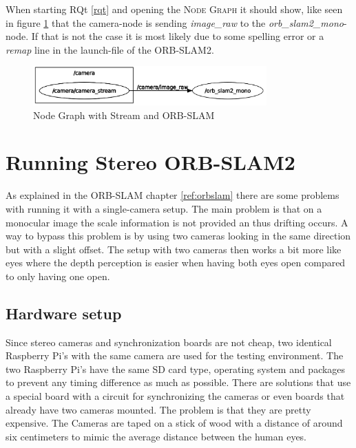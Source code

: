 When starting RQt \ref{rqt} and opening the \textsc{Node Graph} it should show, like seen in figure \ref{img:nodegraphstreamorbslam} that the camera-node is sending \textit{image\_raw} to the \textit{orb\_slam2\_mono}-node. If that is not the case it is most likely due to some spelling error or a \textit{remap} line in the launch-file of the ORB-SLAM2.\newline
\begin{figure}[h]
	\centering
	\includegraphics[width=0.8\textwidth]{./media/images/nodegraphstreamorbslam.png}
  	\caption{Node Graph with Stream and ORB-SLAM}
  	\label{img:nodegraphstreamorbslam}
\end{figure}


\section{Running Stereo ORB-SLAM2\authorA}
As explained in the ORB-SLAM chapter \ref{ref:orbslam} there are some problems with running it with a single-camera setup. The main problem is that on a monocular image the scale information is not provided an thus drifting occurs. A way to bypass this problem is by using two cameras looking in the same direction but with a slight offset. The setup with two cameras then works a bit more like eyes where the depth perception is easier when having both eyes open compared to only having one open.

\subsection{Hardware setup}
Since stereo cameras and synchronization boards are not cheap, two identical Raspberry Pi's with the same camera are used for the testing environment. The two Raspberry Pi's have the same SD card type, operating system and packages to prevent any timing difference as much as possible. There are solutions that use a special board with a circuit for synchronizing the cameras or even boards that already have two cameras mounted. The problem is that they are pretty expensive. The Cameras are taped on a stick of wood with a distance of around six centimeters to mimic the average distance between the human eyes.

